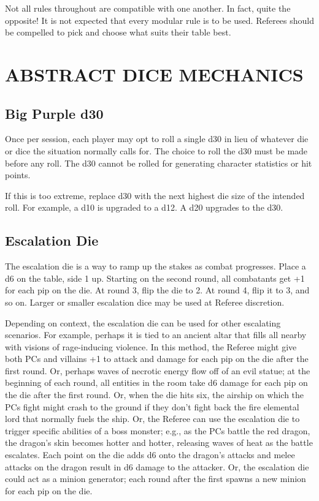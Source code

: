 \documentclass[twoside]{article}
\begin{document}
\bigbreak

Not all rules throughout are compatible with one another. In fact, quite the opposite! It is not expected that every modular rule is to be used. Referees should be compelled to pick and choose what suits their table best.

\section*{ABSTRACT DICE MECHANICS}

\subsection*{Big Purple d30}

Once per session, each player may opt to roll a single d30 in lieu of whatever die or dice the situation normally calls for. The choice to roll the d30 must be made before any roll. The d30 cannot be rolled for generating character statistics or hit points.

\bigbreak

If this is too extreme, replace d30 with the next highest die size of the intended roll. For example, a d10 is upgraded to a d12. A d20 upgrades to the d30.

\subsection*{Escalation Die}

The escalation die is a way to ramp up the stakes as combat progresses. Place a d6 on the table, side 1 up. Starting on the second round, all combatants get +1 for each pip on the die. At round 3, flip the die to 2. At round 4, flip it to 3, and so on. Larger or smaller escalation dice may be used at Referee discretion.

\bigbreak

Depending on context, the escalation die can be used for other escalating scenarios. For example, perhaps it is tied to an ancient altar that fills all nearby with visions of rage-inducing violence. In this method, the Referee might give both PCs and villains +1 to attack and damage for each pip on the die after the first round. Or, perhaps waves of necrotic energy flow off of an evil statue; at the beginning of each round, all entities in the room take d6 damage for each pip on the die after the first round. Or, when the die hits six, the airship on which the PCs fight might crash to the ground if they don't fight back the fire elemental lord that normally fuels the ship. Or, the Referee can use the escalation die to trigger specific abilities of a boss monster; e.g., as the PCs battle the red dragon, the dragon's skin becomes hotter and hotter, releasing waves of heat as the battle escalates. Each point on the die adds d6 onto the dragon's attacks and melee attacks on the dragon result in d6 damage to the attacker. Or, the escalation die could act as a minion generator; each round after the first spawns a new minion for each pip on the die.
\end{document}
